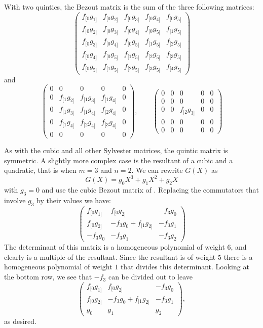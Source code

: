 With two quintics, the Bezout matrix is the sum of the three following
matrices:
\[
\begin{pmatrix}
   f_{[0}g_{1]} & f_{[0}g_{2]} & f_{[0} g_{3]} & f_{[0}g_{4]} & f_{[0}g_{5]} \\
 f_{[0}g_{2]} & f_{[0}g_{3]} & f_{[0} g_{4]} & f_{[0}g_{5]} & f_{[1}g_{5]} \\
 f_{[0}g_{3]} & f_{[0}g_{4]} & f_{[0} g_{5]} &f_{[1}g_{5]} & f_{[2}g_{5]} \\
 f_{[0}g_{4]} & f_{[0}g_{5]} & f_{[1} g_{5]}& f_{[2}g_{5]} & f_{[3}g_{5]} \\
 f_{[0}g_{5]} & f_{[1}g_{5]} & f_{[2}g_{5]} & f_{[3}g_{5]} & f_{[4}g_{5]} 
\end{pmatrix}
\]
and
\[
\begin{pmatrix}
  0 & 0 & 0 & 0 & 0 \\
  0 & f_{[1}g_{2]} & f_{[1} g_{3]} & f_{[1}g_{4]} & 0 \\
  0 & f_{[1}g_{3]} & f_{[1} g_{4]} & f_{[2}g_{4]} & 0 \\
  0 & f_{[1}g_{4]} & f_{[2} g_{4]} & f_{[3}g_{4]} & 0 \\
  0 & 0 & 0 & 0 & 0 
 \end{pmatrix},\qquad
\begin{pmatrix}
  0 & 0 & 0 & 0 & 0 \\
  0 & 0 & 0 & 0 & 0 \\
  0 & 0 & f_{[2} g_{3]} & 0 & 0 \\
  0 & 0 & 0 & 0 & 0 \\
  0 & 0 & 0 & 0 & 0
  \end{pmatrix}
\]

As with the cubic and all other Sylvester matrices, the quintic matrix is
symmetric.  A slightly more complex case is the resultant of a cubic and a
quadratic, that is when $m= 3$ and $n= 2$.  We can rewrite $G(X)$ as
\[
G(X) = g_0 X^3 + g_1 X^2 + g_2 X 
\]
with $g_3 = 0$ and use the cubic Bezout matrix of .
Replacing the commutators that involve $g_3$ by their values we have:
\[
\begin{pmatrix}
  f_{[0}g_{1]} & f_{[0}g_{2]} & - f_3 g_0 \\
  f_{[0}g_{2]} & -f_3 g_0 + f_{[1}g_{2]} & -f_3 g_1 \\
  -f_3g_0 & -f_3g_1 & -f_3 g_2 
  \end{pmatrix}
\]
The determinant of this matrix is a homogeneous polynomial of weight
$6$, and clearly is a multiple of the resultant.  Since the resultant
is of weight $5$ there is a homogeneous polynomial of weight $1$ that
divides this determinant.  Looking at the bottom row, we see that
$-f_3$ can be divided out to leave
\[
\begin{pmatrix}
  f_{[0}g_{1]} & f_{[0}g_{2]} & - f_3 g_0 \\
  f_{[0}g_{2]} & -f_3 g_0 + f_{[1}g_{2]} & -f_3 g_1 \\
  g_0 & g_1 & g_2 
  \end{pmatrix},
\]
as desired.  

